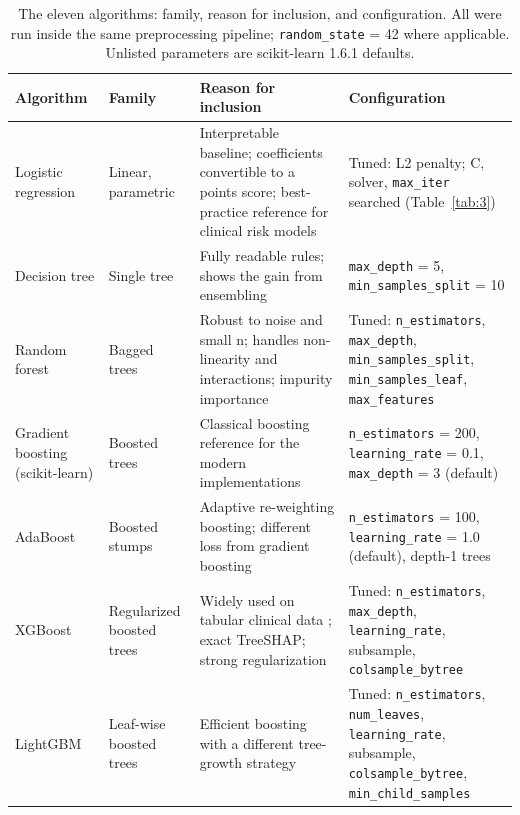 \documentclass[a4paper,fleqn]{cas-dc}
\begin{document}
\begin{table}[tbp]
\caption{The eleven algorithms: family, reason for inclusion, and configuration. All were run inside the same preprocessing pipeline; \texttt{random\_\allowbreak state} = 42 where applicable. Unlisted parameters are scikit-learn 1.6.1 defaults.}
\label{tab:2}
\centering
{\scriptsize
\setlength{\tabcolsep}{3.2pt}
\begin{tabular}{>{\raggedright\arraybackslash}p{}>{\raggedright\arraybackslash}p{}>{\raggedright\arraybackslash}p{}>{\raggedright\arraybackslash}p{}}
\toprule
\textbf{Algorithm} & \textbf{Family} & \textbf{Reason for inclusion} & \textbf{Configuration} \\
\midrule
Logistic regression & Linear, parametric & Interpretable baseline; coefficients convertible to a points score; best-practice reference for clinical risk models & Tuned: L2 penalty; C, solver, \texttt{max\_\allowbreak iter} searched (Table~\ref{tab:3}) \\
Decision tree & Single tree & Fully readable rules; shows the gain from ensembling & \texttt{max\_\allowbreak depth} = 5, \texttt{min\_\allowbreak samples\_\allowbreak split} = 10 \\
Random forest & Bagged trees & Robust to noise and small n; handles non-linearity and interactions; impurity importance & Tuned: \texttt{n\_\allowbreak estimators}, \texttt{max\_\allowbreak depth}, \texttt{min\_\allowbreak samples\_\allowbreak split}, \texttt{min\_\allowbreak samples\_\allowbreak leaf}, \texttt{max\_\allowbreak features} \\
Gradient boosting (scikit-learn) & Boosted trees & Classical boosting reference for the modern implementations & \texttt{n\_\allowbreak estimators} = 200, \texttt{learning\_\allowbreak rate} = 0.1, \texttt{max\_\allowbreak depth} = 3 (default) \\
AdaBoost & Boosted stumps & Adaptive re-weighting boosting; different loss from gradient boosting & \texttt{n\_\allowbreak estimators} = 100, \texttt{learning\_\allowbreak rate} = 1.0 (default), depth-1 trees \\
XGBoost & Regularized boosted trees & Widely used on tabular clinical data \cite{r7}; exact TreeSHAP; strong regularization & Tuned: \texttt{n\_\allowbreak estimators}, \texttt{max\_\allowbreak depth}, \texttt{learning\_\allowbreak rate}, subsample, \texttt{colsample\_\allowbreak bytree} \\
LightGBM & Leaf-wise boosted trees & Efficient boosting with a different tree-growth strategy & Tuned: \texttt{n\_\allowbreak estimators}, \texttt{num\_\allowbreak leaves}, \texttt{learning\_\allowbreak rate}, subsample, \texttt{colsample\_\allowbreak bytree}, \texttt{min\_\allowbreak child\_\allowbreak samples} \\

\end{tabular}}
\end{table}
\end{document}
